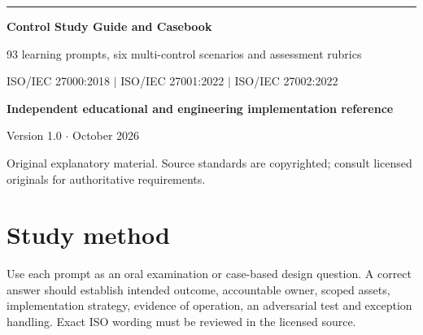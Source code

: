 \documentclass[11pt,letterpaper]{article}
\begin{document}
\begin{titlepage}
\vspace*{1.2in}
{\color{teal}\rule{\textwidth}{4pt}}\par\vspace{20pt}
{\Huge\bfseries\color{navy} Control Study Guide and Casebook}\par\vspace{18pt}
{\Large\color{graytext} 93 learning prompts, six multi-control scenarios and assessment rubrics}\par\vspace{1.3in}
{\large ISO/IEC 27000:2018 $\vert$ ISO/IEC 27001:2022 $\vert$ ISO/IEC 27002:2022}\par
\vfill
\textbf{Independent educational and engineering implementation reference}\par
Version 1.0 $\cdot$ October 2026\par
{\small Original explanatory material. Source standards are copyrighted; consult licensed originals for authoritative requirements.}\par
\end{titlepage}
\tableofcontents\clearpage{}
\section{Study method}
Use each prompt as an oral examination or case-based design question. A correct answer should establish intended outcome, accountable owner, scoped assets, implementation strategy, evidence of operation, an adversarial test and exception handling. Exact ISO wording must be reviewed in the licensed source.
\end{document}
